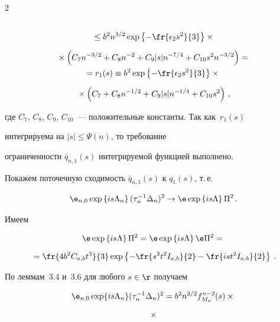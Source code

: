 \begin{multicols}{2}
\begin{multline*}
{}\\


{}


\leq b^2 n^{3/2}\exp\left\{-\fr{\epsilon_2 s^2}{3}\right\} \times{}\\[6pt]


{}\times


\left(C_7n^{-3/2} + C_8n^{-2} + C_9|s|n^{-7/4} + C_{10}s^2n^{-3/2}\right) ={}


\\


= r_1(s) \equiv b^2 \exp\left\{-\fr{\epsilon_2 s^2}{3}\right\} \times{}\\[6pt]


{}\times


\left(C_7 + C_8n^{-1/2} + C_9|s|n^{-1/4} + C_{10}s^2\right)\,,


\end{multline*}


где $C_7$, $C_8$, $C_9$, $C_{10}$~--- положительные константы. Так как~$r_1(s)$ 


интегрируема на $|s| \leq \Psi(n)$, то требование


ограниченности $\bar{q}_{n,1}(s)$ интегрируемой функцией выполнено.


Покажем поточечную сходимость $\bar{q}_{n,1}(s)$ к $q_1(s)$, т.\,е.


$$


{\e}_{n,0} \exp\left\{is\Lambda_n\right\} (\tau_n^{-1} \Delta_n)^2 \to {\e} \exp\left\{is\Lambda\right\} \Pi^2\,.


$$


Имеем


\begin{multline*}


{\e} \exp\left\{is\Lambda\right\} \Pi^2 = {\e} \exp\left\{is\Lambda\right\} {\e} \Pi^2 ={}\\[6pt]


{}= \fr{4b^2\cab t^3}{3} \exp\left\{-\fr{s^2t^2\iab}{2}-\fr{ist^2\iab}{2}\right\}\,.


\end{multline*}


По леммам~3.4 и~3.6 для любого $s\in{\r}$ получаем


\begin{multline*}


{\e}_{n,0}\exp\{is\Lambda_n\}(\tau_n^{-1}\Delta_n)^2 = b^2 n^{3/2}  f_{M_n}^{n-2}(s) \times{}\\[6pt]


{}\times



\end{multline*}
\end{multicols}
